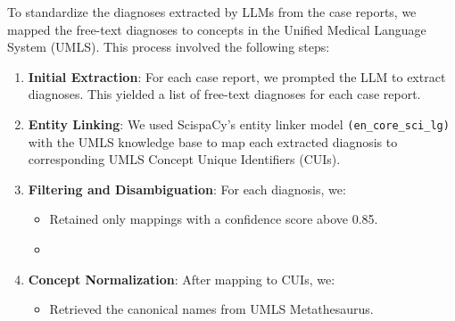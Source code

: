 To standardize the diagnoses extracted by LLMs from the case reports, we mapped the free-text diagnoses to concepts in the Unified Medical Language System (UMLS). 
This process involved the following steps:

\begin{enumerate}
    \item \textbf{Initial Extraction}: For each case report, we prompted the LLM to extract diagnoses. 
    This yielded a list of free-text diagnoses for each case report.

    \item \textbf{Entity Linking}: We used ScispaCy's entity linker model 
    \texttt{(en\_core\_sci\_lg)} with the UMLS knowledge base to map each extracted diagnosis to corresponding UMLS Concept Unique Identifiers (CUIs). 

    \item \textbf{Filtering and Disambiguation}: For each diagnosis, we:
    \begin{itemize}
        \item Retained only mappings with a confidence score above 0.85.
        \item {}
    \end{itemize}

    \item \textbf{Concept Normalization}: After mapping to CUIs, we:
    \begin{itemize}
        \item Retrieved the canonical names from UMLS Metathesaurus.
    \end{itemize}
\end{enumerate}

% 

